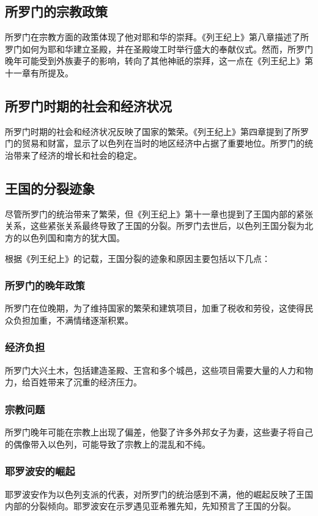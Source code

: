 \documentclass[12pt, a4paper]{ctexart}
\begin{document}
\subsection{所罗门的宗教政策}
所罗门在宗教方面的政策体现了他对耶和华的崇拜。《列王纪上》第八章描述了所罗门如何为耶和华建立圣殿，并在圣殿竣工时举行盛大的奉献仪式。然而，所罗门晚年可能受到外族妻子的影响，转向了其他神祇的崇拜，这一点在《列王纪上》第十一章有所提及。

\subsection{所罗门时期的社会和经济状况}
所罗门时期的社会和经济状况反映了国家的繁荣。《列王纪上》第四章提到了所罗门的贸易和财富，显示了以色列在当时的地区经济中占据了重要地位。所罗门的统治带来了经济的增长和社会的稳定。

\subsection{王国的分裂迹象}
尽管所罗门的统治带来了繁荣，但《列王纪上》第十一章也提到了王国内部的紧张关系，这些紧张关系最终导致了王国的分裂。所罗门去世后，以色列王国分裂为北方的以色列国和南方的犹大国。

根据《列王纪上》的记载，王国分裂的迹象和原因主要包括以下几点：

\subsubsection{所罗门的晚年政策}
所罗门在位晚期，为了维持国家的繁荣和建筑项目，加重了税收和劳役，这使得民众负担加重，不满情绪逐渐积累。

\subsubsection{经济负担}
所罗门大兴土木，包括建造圣殿、王宫和多个城邑，这些项目需要大量的人力和物力，给百姓带来了沉重的经济压力。

\subsubsection{宗教问题}
所罗门晚年可能在宗教上出现了偏差，他娶了许多外邦女子为妻，这些妻子将自己的偶像带入以色列，可能导致了宗教上的混乱和不纯。

\subsubsection{耶罗波安的崛起}
耶罗波安作为以色列支派的代表，对所罗门的统治感到不满，他的崛起反映了王国内部的分裂倾向。耶罗波安在示罗遇见亚希雅先知，先知预言了王国的分裂。
\end{document}
